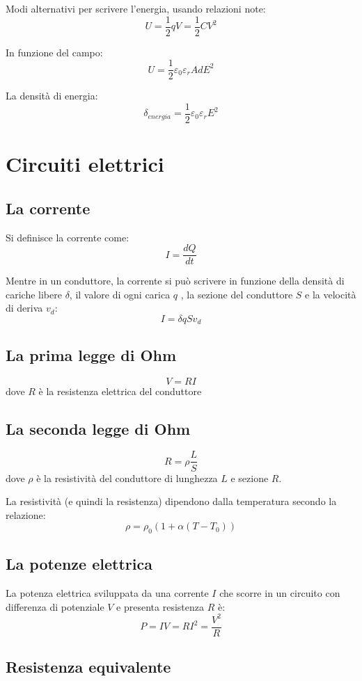 \documentclass[12pt]{article}
\begin{document}
Modi alternativi per scrivere l'energia, usando relazioni note:
$$ U = \frac{1}{2}qV = \frac{1}{2}CV^2 $$

In funzione del campo:
$$ U = \frac{1}{2} \varepsilon_0 \varepsilon_r AdE^2 $$

La densità di energia:
$$ \delta_{energia} = \frac{1}{2} \varepsilon_0 \varepsilon_r E^2 $$

\newpage
\section{Circuiti elettrici}
\subsection{La corrente}
Si definisce la corrente come:
$$ I = \frac{dQ}{dt} $$

Mentre in un conduttore, la corrente si può scrivere in funzione della densità di cariche libere $\delta$, il valore di ogni carica $q$ , la sezione del conduttore $S$ e la velocità di deriva $v_d$:
$$I = \delta qSv_d$$

\subsection{La prima legge di Ohm}
$$ V = RI $$
dove $R$ è la resistenza elettrica del conduttore

\subsection{La seconda legge di Ohm}
$$ R = \rho \frac{L}{S} $$
dove $\rho$ è la resistività del conduttore di lunghezza $L$ e sezione $R$.

\vspace{1em}

La resistività (e quindi la resistenza) dipendono dalla temperatura secondo la relazione:
$$ \rho = \rho_0 (1 + \alpha(T-T_0)) $$

\subsection{La potenze elettrica}
La potenza elettrica sviluppata da una corrente $I$ che scorre in un circuito con differenza di potenziale $V$ e presenta resistenza $R$ è:
$$ P = IV = RI^2 = \frac{V^2}{R} $$

\subsection{Resistenza equivalente}
\end{document}
